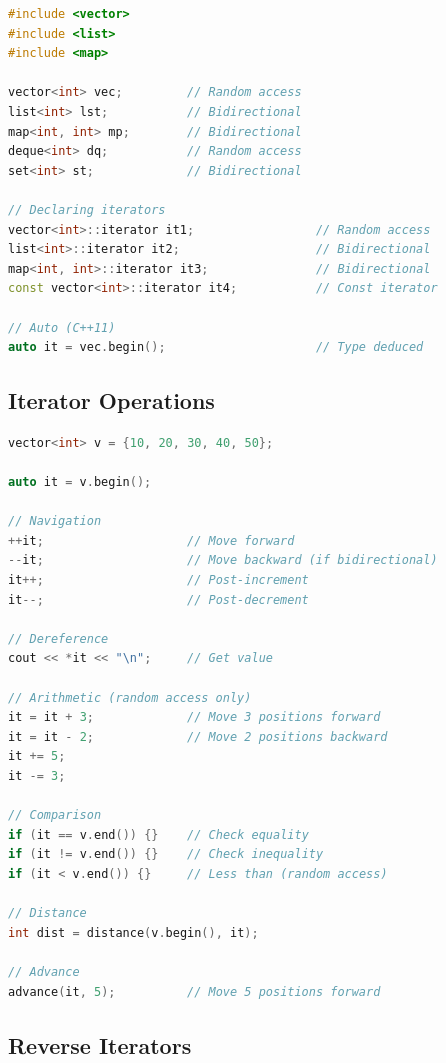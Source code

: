 \begin{lstlisting}[language={C++}]
#include <vector>
#include <list>
#include <map>

vector<int> vec;         // Random access
list<int> lst;           // Bidirectional
map<int, int> mp;        // Bidirectional
deque<int> dq;           // Random access
set<int> st;             // Bidirectional

// Declaring iterators
vector<int>::iterator it1;                 // Random access
list<int>::iterator it2;                   // Bidirectional
map<int, int>::iterator it3;               // Bidirectional
const vector<int>::iterator it4;           // Const iterator

// Auto (C++11)
auto it = vec.begin();                     // Type deduced
\end{lstlisting}

\hypertarget{iterator-operations}{%
\subsection{Iterator Operations}\label{iterator-operations}}

\begin{lstlisting}[language={C++}]
vector<int> v = {10, 20, 30, 40, 50};

auto it = v.begin();

// Navigation
++it;                    // Move forward
--it;                    // Move backward (if bidirectional)
it++;                    // Post-increment
it--;                    // Post-decrement

// Dereference
cout << *it << "\n";     // Get value

// Arithmetic (random access only)
it = it + 3;             // Move 3 positions forward
it = it - 2;             // Move 2 positions backward
it += 5;
it -= 3;

// Comparison
if (it == v.end()) {}    // Check equality
if (it != v.end()) {}    // Check inequality
if (it < v.end()) {}     // Less than (random access)

// Distance
int dist = distance(v.begin(), it);

// Advance
advance(it, 5);          // Move 5 positions forward
\end{lstlisting}

\hypertarget{reverse-iterators}{%
\subsection{Reverse Iterators}\label{reverse-iterators}}

